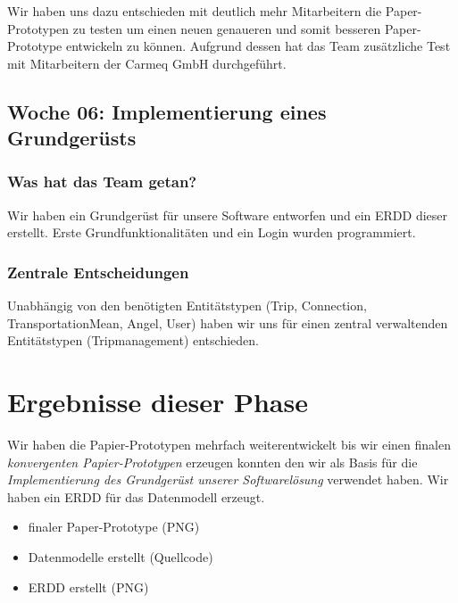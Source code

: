 \documentclass{article}
\begin{document}
Wir haben uns dazu entschieden mit deutlich mehr Mitarbeitern die Paper-Prototypen zu testen um einen neuen genaueren und somit besseren Paper-Prototype entwickeln zu k\"onnen. Aufgrund dessen hat das Team zus\"atzliche Test mit Mitarbeitern der Carmeq GmbH durchgef\"uhrt.

\subsection{Woche 06: Implementierung eines Grundger\"usts}

\subsubsection{Was hat das Team getan?}

Wir haben ein Grundger\"ust f\"ur unsere Software entworfen und ein ERDD dieser erstellt. Erste Grundfunktionalit\"aten und ein Login wurden programmiert.

\subsubsection{Zentrale Entscheidungen}

Unabh\"angig von den ben\"otigten Entit\"atstypen (Trip, Connection, TransportationMean, Angel, User) haben wir uns f\"ur einen zentral verwaltenden Entit\"atstypen (Tripmanagement) entschieden.

\section*{Ergebnisse dieser Phase}

Wir haben die Papier-Prototypen mehrfach weiterentwickelt bis wir einen finalen \textit{konvergenten Papier-Prototypen} erzeugen konnten den wir als Basis f\"ur die \textit{Implementierung des Grundger\"ust unserer Softwarel\"osung} verwendet haben. Wir haben ein ERDD f\"ur das Datenmodell erzeugt.

\begin{itemize}
\item finaler Paper-Prototype (PNG)
\item Datenmodelle erstellt (Quellcode)
\item ERDD erstellt (PNG)
\end{itemize}
\end{document}

